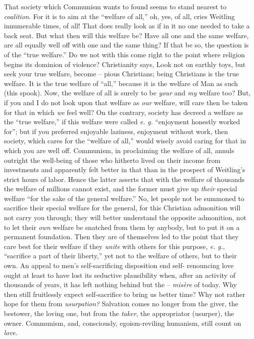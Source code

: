 \documentclass[12pt,a4paper]{book}
\begin{document}
That society which Communism wants to found seems to stand nearest to 
\textit{coalition}. For it is to aim at the ``welfare of all,'' oh, yes, of 
all, cries Weitling innumerable times, of all! That does really look as if in 
it no one needed to take a back seat. But what then will this welfare be? Have 
all one and the same welfare, are all equally well off with one and the same 
thing? If that be so, the question is of the ``true welfare.'' Do we not 
with this come right to the point where religion begins its dominion of 
violence? Christianity says, Look not on earthly toys, but seek your true 
welfare, become -- pious Christians; being Christians is the true welfare. It 
is the true welfare of ``all,'' because it is the welfare of Man as such 
(this spook). Now, the welfare of all is surely to be \textit{your} and 
\textit{my} welfare too? But, if you and I do not look upon that welfare as 
\textit{our} welfare, will care then be taken for that in which \textit{we} 
feel well? On the contrary, society has decreed a welfare as the ``true 
welfare,'' if this welfare were called \textit{e. g.} ``enjoyment honestly 
worked for''; but if you preferred enjoyable laziness, enjoyment without 
work, then society, which cares for the ``welfare of all,'' would wisely 
avoid caring for that in which you are well off. Communism, in proclaiming the 
welfare of all, annuls outright the well-being of those who hitherto lived on 
their income from investments and apparently felt better in that than in the 
prospect of Weitling's strict hours of labor. Hence the latter asserts that 
with the welfare of thousands the welfare of millions cannot exist, and the 
former must give up \textit{their} special welfare ``for the sake of the 
general welfare.'' No, let people not be summoned to sacrifice their special 
welfare for the general, for this Christian admonition will not carry you 
through; they will better understand the opposite admonition, not to let their 
\textit{own} welfare be snatched from them by anybody, but to put it on a 
permanent foundation. Then they are of themselves led to the point that they 
care best for their welfare if they \textit{unite} with others for this 
purpose, \textit{e. g.}, ``sacrifice a part of their liberty,'' yet not to 
the welfare of others, but to their own. An appeal to men's self-sacrificing 
disposition end self- renouncing love ought at least to have lost its 
seductive plausibility when, after an activity of thousands of years, it has 
left nothing behind but the -- \textit{mis\`ere} of today. Why then still 
fruitlessly expect self-sacrifice to bring us better time? Why not rather hope 
for them from \textit{usurpation?} Salvation comes no longer from the giver, 
the bestower, the loving one, but from the \textit{taker}, the appropriator 
(usurper), the owner. Communism, and, consciously, egoism-reviling humanism, 
still count on \textit{love}.
\end{document}
